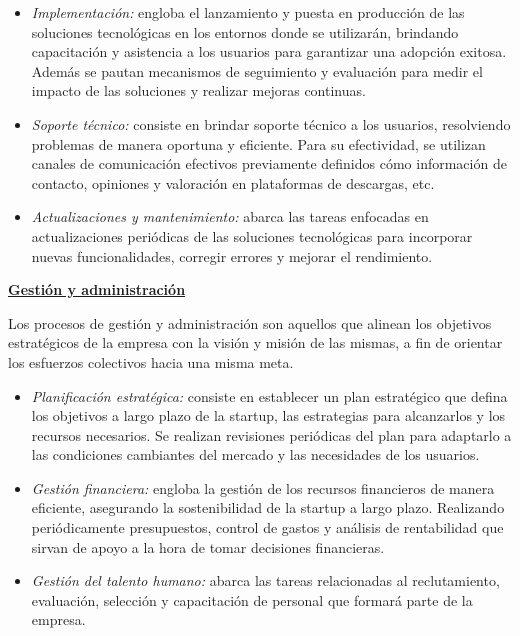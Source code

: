 \documentclass[a4paper,12pt]{article}
\begin{document}
    \begin{itemize}
        \item[] \textit{Implementación:} engloba el lanzamiento y puesta en producción de las soluciones tecnológicas en los entornos donde se utilizarán, brindando capacitación y asistencia a los usuarios para garantizar una adopción exitosa. Además se pautan mecanismos de seguimiento y evaluación para medir el impacto de las soluciones y realizar mejoras continuas.
        \item[] \textit{Soporte técnico:} consiste en brindar soporte técnico a los usuarios, resolviendo problemas de manera oportuna y eficiente. Para su efectividad, se utilizan canales de comunicación efectivos previamente definidos cómo información de contacto, opiniones y valoración en plataformas de descargas, etc.
        \item[] \textit{Actualizaciones y mantenimiento:} abarca las tareas enfocadas en actualizaciones periódicas de las soluciones tecnológicas para incorporar nuevas funcionalidades, corregir errores y mejorar el rendimiento.
    \end{itemize}
    \par \noindent \textbf{\underline{Gestión y administración}}
    \newline
    \par Los procesos de gestión y administración son aquellos que alinean los objetivos estratégicos de la empresa con la visión y misión de las mismas, a fin de orientar los esfuerzos colectivos hacia una misma meta.
    \begin{itemize}
        \item[] \textit{Planificación estratégica:} consiste en establecer un plan estratégico que defina los objetivos a largo plazo de la startup, las estrategias para alcanzarlos y los recursos necesarios. Se realizan revisiones periódicas del plan para adaptarlo a las condiciones cambiantes del mercado y las necesidades de los usuarios.
        \item[] \textit{Gestión financiera:} engloba la gestión de los recursos financieros de manera eficiente, asegurando la sostenibilidad de la startup a largo plazo. Realizando periódicamente presupuestos, control de gastos y análisis de rentabilidad que sirvan de apoyo a la hora de tomar decisiones financieras.
        \item[] \textit{Gestión del talento humano:} abarca las tareas relacionadas al reclutamiento, evaluación, selección y capacitación de personal que formará parte de la empresa.
    \end{itemize}
\end{document}
